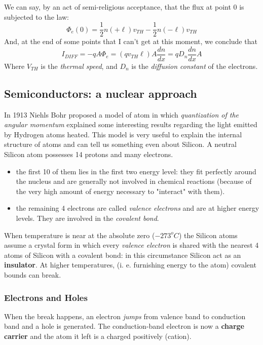 \documentclass[12pt]{article}
\newcommand{\B}{\textbf}
\newcommand{\I}{\textit}
\begin{document}
We can say, by an act of semi-religious acceptance, that the flux at point 0 is subjected to the law:
\begin{equation}
	\Phi_e(0) = \frac{1}{2}n(+\ell)v_{TH}-\frac{1}{2}n(-\ell)v_{TH}
\end{equation}
And, at the end of some points that I can't get at this moment, we conclude that
\begin{equation}
	I_{DIFF} = -qA\Phi_e= (qv_{TH}\ell)A\frac{dn}{dx} = qD_n\frac{dn}{dx}A
\end{equation}
Where $V_{TH}$ is the \I{thermal speed}, and $D_n$ is the \I{diffusion constant} of the electrons. 
\subsection{Semiconductors: a nuclear approach}
In 1913 Niehls Bohr  proposed a model of atom in which \I{quantization of the angular momentum}  explained some interesting results regarding the light emitted by Hydrogen atoms heated. This model is very useful to explain the internal structure of atoms and can tell us something even about Silicon. A neutral Silicon atom possesses 14 protons and many electrons.
\begin{itemize}
	\item the first 10 of them lies in the first two energy level: they fit perfectly around the nucleus and  are generally not involved in chemical reactions (because of the very high amount of energy necessary to "interact" with them).
	\item the remaining 4 electrons are called \textit{valence electrons} and are at higher energy levels. They are involved in the \textit{covalent bond}.
\end{itemize}
When temperature is near at the absolute zero ($-273^o C$) the Silicon atoms assume a crystal form in which every \textit{valence electron} is shared with the nearest 4 atoms of Silicon with a covalent bond: in this circumstance Silicon act as an \textbf{insulator}.
At higher temperatures, (i. e. furnishing energy to the atom) covalent bounds can break. 
\subsubsection{Electrons and Holes}
When the break happens, an electron \I{jumps} from valence band to conduction band and a hole is generated. The conduction-band electron is now a \B{charge carrier} and the atom it left is a charged positively (cation). 
\end{document}
